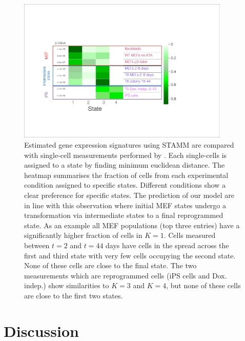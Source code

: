 \begin{figure}
  \centering
  \includegraphics[width=0.9\textwidth]{pics/Heat_single_cells.pdf}
  \caption{Estimated gene expression signatures using STAMM are compared with single-cell measurements performed by \cite{Buganim:2012hp}. Each single-cells is assigned to a state by finding minimum euclidean distance. The heatmap summarises the fraction of cells from each experimental condition assigned to specific states. Different conditions show a clear preference for specific states. The prediction of our model are in line with this observation where initial MEF states undergo a transformation via intermediate states to a final reprogrammed state. As an example all MEF populations (top three entries) have a significantly higher fraction of cells in $K=1$. Cells measured between $t=2$ and $t=44$ days have cells in the spread across the first and third state with very few cells occupying the second state. None of these cells are close to the final state. The two measurements which are reprogrammed cells (iPS cells and Dox. indep.) show similarities to $K=3$ and $K=4$, but none of these cells are close to the first two states.
}
  \label{fig:buganim-heat}
\end{figure}

\section{Discussion}
\label{sec:discussion-ips}

